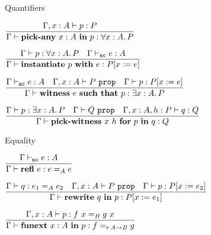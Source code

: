 \begin{frame}{Quantifiers}

\begin{center}
  $\infrule{\proves[\extend{\Gamma}{x}{A}]{p}{P}}{\proves[\Gamma]{\allintro{x}[A]{p}}{\All{x}[A]{P}}}$

  \vspace{1em}

  $\infrule{\proves{p}{\All{x}[A]{P}} \quad \typing[\Gamma][\noncomputable]{e}{A}}{\proves{\allelim{p}{e}}{\subst{P}{x}{e}}}$

  \vspace{2em}

  $\infrule{\typing[\Gamma][\noncomputable]{e}{A} \quad \prop[\extend{\Gamma}{x}{A}]{P} \quad \proves{p}{\subst{P}{x}{e}}}{\proves{\exintro{e}{p}}{\Ex{x}[A]{P}}}$

  \vspace{1em}

  $\infrule{\proves[\Gamma]{p}{\Ex{x}[A]{P}} \quad \prop{Q} \quad \proves[\assume{\extend{\Gamma}{x}{A}}{h}{P}]{q}{Q}}{\proves[\Gamma]{\exelim{x}{h}{p}{q}}{Q}}$
\end{center}

\end{frame}

\begin{frame}{Equality}

\begin{center}
  $\infrule{\typing[\Gamma][\noncomputable]{e}{A}}{\proves[\Gamma]{\refl[e]}{\Eq[A]{e}{e}}}$

  \vspace{2em}

  $\infrule{\proves[\Gamma]{q}{\Eq[A]{e_1}{e_2}} \quad \prop[\extend{\Gamma}{x}{A}]{P} \quad \proves[\Gamma]{p}{\subst{P}{x}{e_2}}}{\proves[\Gamma]{\rewrite{q}{p}}{\subst{P}{x}{e_1}}}$

  \vspace{2em}

  $\infrule{\proves[\extend{\Gamma}{x}{A}]{p}{\Eq[B]{\app{f}{x}}{\app{g}{x}}}}{\proves[\Gamma]{\funext{x}[A]{p}}{\Eq[\Fun[r]{A}{B}]}{f}{g}}$
\end{center}

\end{frame}


